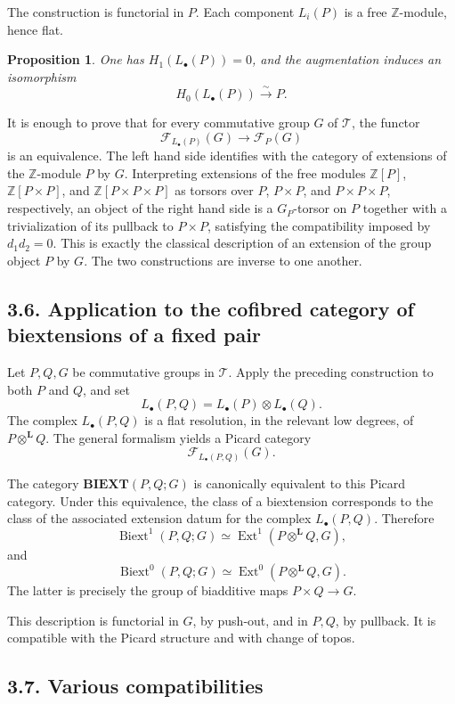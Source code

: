 \documentclass[11pt]{article}
\newtheorem{proposition}{Proposition}[section]
\newcommand{\bZ}{\mathbb Z}
\newcommand{\bL}{\mathbf L}
\newcommand{\Ext}{\operatorname{Ext}}
\newcommand{\Biext}{\operatorname{Biext}}
\newcommand{\BIEXT}{\mathbf{BIEXT}}
\newcommand{\cT}{\mathcal T}
\newcommand{\cF}{\mathcal F}
\begin{document}
The construction is functorial in \(P\). Each component \(L_i(P)\) is a free
\(\bZ\)-module, hence flat.

\begin{proposition}
One has \(H_1(L_\bullet(P))=0\), and the augmentation induces an isomorphism
\[
H_0(L_\bullet(P))\xrightarrow{\sim}P.
\]
\end{proposition}

It is enough to prove that for every commutative group \(G\) of \(\cT\), the
functor
\[
\cF_{L_\bullet(P)}(G)\longrightarrow \cF_P(G)
\]
is an equivalence. The left hand side identifies with the category of extensions
of the \(\bZ\)-module \(P\) by \(G\). Interpreting extensions of the free modules
\(\bZ[P]\), \(\bZ[P\times P]\), and \(\bZ[P\times P\times P]\) as torsors over
\(P\), \(P\times P\), and \(P\times P\times P\), respectively, an object of the
right hand side is a \(G_P\)-torsor on \(P\) together with a trivialization of its
pullback to \(P\times P\), satisfying the compatibility imposed by \(d_1d_2=0\).
This is exactly the classical description of an extension of the group object
\(P\) by \(G\). The two constructions are inverse to one another.

\subsection*{3.6. Application to the cofibred category of biextensions of a fixed pair}

Let \(P,Q,G\) be commutative groups in \(\cT\). Apply the preceding construction
to both \(P\) and \(Q\), and set
\[
L_\bullet(P,Q)=L_\bullet(P)\otimes L_\bullet(Q).
\]
The complex \(L_\bullet(P,Q)\) is a flat resolution, in the relevant low degrees,
of \(P\otimes^{\bL}Q\). The general formalism yields a Picard category
\[
\cF_{L_\bullet(P,Q)}(G).
\]

The category \(\BIEXT(P,Q;G)\) is canonically equivalent to this Picard category.
Under this equivalence, the class of a biextension corresponds to the class of the
associated extension datum for the complex \(L_\bullet(P,Q)\). Therefore
\[
\Biext^1(P,Q;G)\simeq
\Ext^1(P\otimes^{\bL}Q,G),
\]
and
\[
\Biext^0(P,Q;G)\simeq
\Ext^0(P\otimes^{\bL}Q,G).
\]
The latter is precisely the group of biadditive maps \(P\times Q\to G\).

This description is functorial in \(G\), by push-out, and in \(P,Q\), by
pullback. It is compatible with the Picard structure and with change of topos.

\subsection*{3.7. Various compatibilities}
\end{document}
